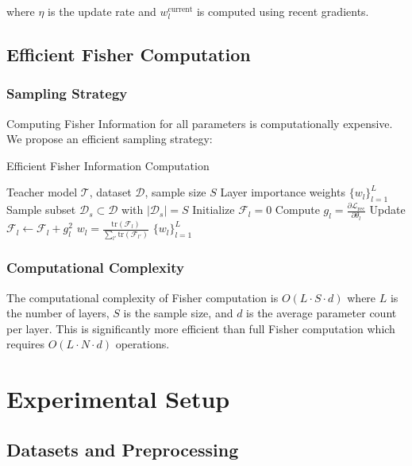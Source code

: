 \documentclass[10pt,conference]{IEEEtran}
\newcommand{\fisher}{\mathcal{F}}
\newcommand{\loss}{\mathcal{L}}
\newcommand{\teacher}{\mathcal{T}}
\begin{document}
where $\eta$ is the update rate and $w_l^{\text{current}}$ is computed using recent gradients.

\subsection{Efficient Fisher Computation}

\subsubsection{Sampling Strategy}

Computing Fisher Information for all parameters is computationally expensive. We propose an efficient sampling strategy:

\begin{algorithm}[t]
\caption{Efficient Fisher Information Computation}
\label{alg:fisher_computation}
\begin{algorithmic}[1]
\REQUIRE Teacher model $\teacher$, dataset $\mathcal{D}$, sample size $S$
\ENSURE Layer importance weights $\{w_l\}_{l=1}^L$
\STATE Sample subset $\mathcal{D}_s \subset \mathcal{D}$ with $|\mathcal{D}_s| = S$
    \STATE Initialize $\fisher_l = 0$
        \STATE Compute $g_l = \frac{\partial \loss_{\text{rec}}}{\partial \theta_l}$
        \STATE Update $\fisher_l \leftarrow \fisher_l + g_l^2$
    \ENDFOR
    \STATE $w_l = \frac{\text{tr}(\fisher_l)}{\sum_{l'} \text{tr}(\fisher_{l'})}$
\ENDFOR
\RETURN $\{w_l\}_{l=1}^L$
\end{algorithmic}
\end{algorithm}

\subsubsection{Computational Complexity}

The computational complexity of Fisher computation is $O(L \cdot S \cdot d)$ where $L$ is the number of layers, $S$ is the sample size, and $d$ is the average parameter count per layer. This is significantly more efficient than full Fisher computation which requires $O(L \cdot N \cdot d)$ operations.

\section{Experimental Setup}

\subsection{Datasets and Preprocessing}
\end{document}
